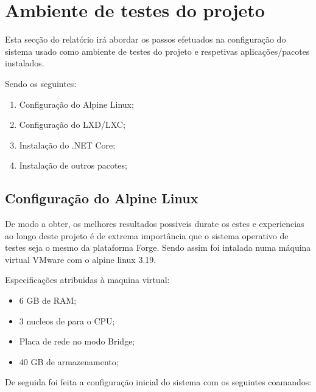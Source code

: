 \section{Ambiente de testes do projeto}

Esta secção do relatório irá abordar os passos efetuados na configuração do sistema 
usado como ambiente de testes do projeto e respetivas aplicações/pacotes instalados.

Sendo os seguintes:
\begin{enumerate}
    \item Configuração do Alpine Linux;
    \item Configuração do LXD/LXC;
    \item Instalação do .NET Core;
    \item Instalação de outros pacotes;
\end{enumerate}


\subsection{Configuração do Alpine Linux}

De modo a obter, os melhores resultados possiveis durate os estes e experiencias
ao longo deste projeto é de extrema importância que o sistema operativo de testes
seja o mesmo da plataforma Forge. Sendo assim foi intalada numa máquina virtual
VMware com o alpine linux 3.19.

Especificações atribuidas à maquina virtual:

\begin{itemize}
    \item 6 GB de RAM;
    \item 3 nucleos de para o CPU;
    \item Placa de rede no modo Bridge;
    \item 40 GB de armazenamento;
\end{itemize}

De seguida foi feita a configuração inicial do sistema com os seguintes coamandos:


